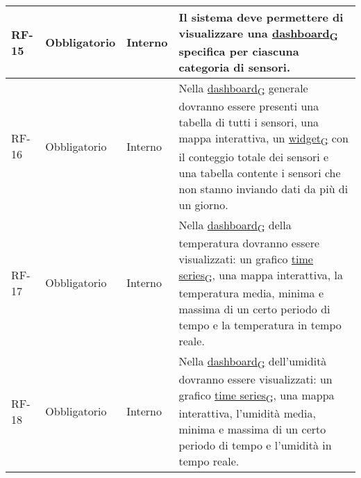 \begin{longtable}{|>{\centering\arraybackslash}m{}|>{\centering\arraybackslash}m{}|>{\centering\arraybackslash}m{}|>{\centering\arraybackslash}m{}|}
	RF-15           & Obbligatorio        & Interno                                                                                                           & Il sistema deve permettere di visualizzare una \href{https://7last.github.io/docs/rtb/documentazione-interna/glossario\#dashboard}{dashboard\textsubscript{G}} specifica per ciascuna categoria di sensori.                                                                                                                                                                                                                                                                                          \\\hline
	RF-16           & Obbligatorio        & Interno                                                                                                           & Nella \href{https://7last.github.io/docs/rtb/documentazione-interna/glossario\#dashboard}{dashboard\textsubscript{G}} generale dovranno essere presenti una tabella di tutti i sensori, una mappa interattiva, un \href{https://7last.github.io/docs/rtb/documentazione-interna/glossario\#widget}{widget\textsubscript{G}} con il conteggio totale dei sensori e una tabella contente i sensori che non stanno inviando dati da più di un giorno.                                                   \\\hline
	RF-17           & Obbligatorio        & Interno                                                                                                           & Nella \href{https://7last.github.io/docs/rtb/documentazione-interna/glossario\#dashboard}{dashboard\textsubscript{G}} della temperatura dovranno essere visualizzati: un grafico \href{https://7last.github.io/docs/rtb/documentazione-interna/glossario\#time-series}{time series\textsubscript{G}}, una mappa interattiva, la temperatura media, minima e massima di un certo periodo di tempo e la temperatura in tempo reale.                                                                    \\\hline
	RF-18           & Obbligatorio        & Interno                                                                                                           & Nella \href{https://7last.github.io/docs/rtb/documentazione-interna/glossario\#dashboard}{dashboard\textsubscript{G}} dell'umidità dovranno essere visualizzati: un grafico \href{https://7last.github.io/docs/rtb/documentazione-interna/glossario\#time-series}{time series\textsubscript{G}}, una mappa interattiva, l'umidità media, minima e massima di un certo periodo di tempo e l'umidità in tempo reale.                                                                                   \\\hline

\end{longtable}
